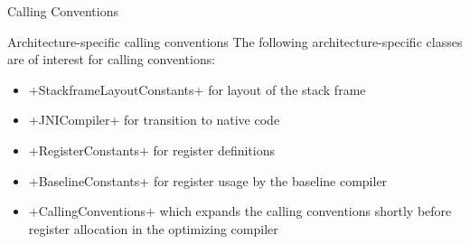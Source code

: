 \begin{section}{Calling Conventions}
\begin{subsection}{Architecture-specific calling conventions}
The following architecture-specific classes are of interest for calling conventions:
\begin{itemize}
  \item \spverb+StackframeLayoutConstants+ for layout of the stack frame
  \item \spverb+JNICompiler+ for transition to native code
  \item \spverb+RegisterConstants+ for register definitions
  \item \spverb+BaselineConstants+ for register usage by the baseline compiler
  \item \spverb+CallingConventions+ which expands the calling conventions shortly before register allocation in the optimizing compiler
\end{itemize}

\end{subsection}

\end{section}
